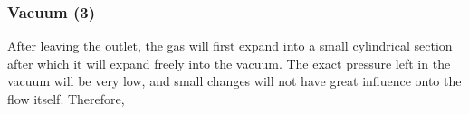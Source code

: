 \subsubsection{Vacuum (3)}

	After leaving the outlet, the gas will first expand into a small cylindrical section after which it will expand freely into the vacuum.
	The exact pressure left in the vacuum will be very low, and small changes will not have great influence onto the flow itself.
	Therefore,

\newpage

